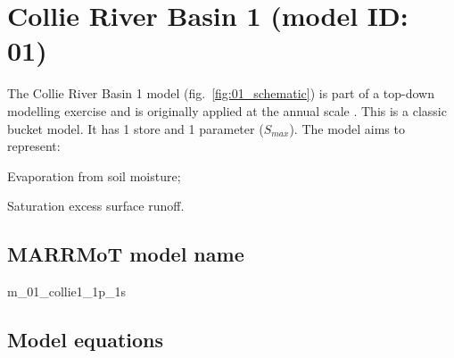 \section{Collie River Basin 1 (model ID: 01)}
The Collie River Basin 1 model (fig.~\ref{fig:01_schematic}) is part of a top-down modelling exercise and is originally applied at the annual scale \citep{Jothityangkoon2001}. This is a classic bucket model. It has 1 store and 1 parameter ($S_{max}$). The model aims to represent:

\begin{itemizecompact}
\item Evaporation from soil moisture;
\item Saturation excess surface runoff.
\end{itemizecompact}

\subsection{MARRMoT model name}
m\_01\_collie1\_1p\_1s \\

\subsection{Model equations}

